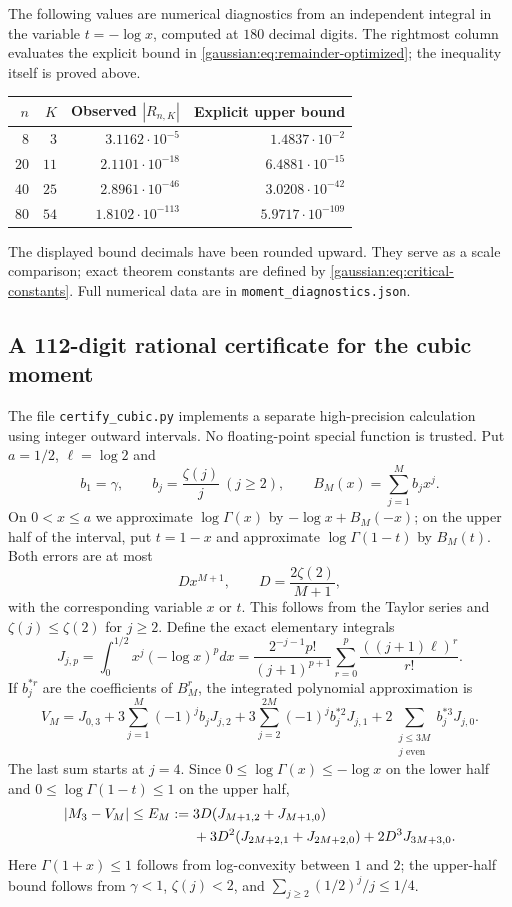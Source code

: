 The following values are numerical diagnostics from an independent integral
in the variable $t=-\log x$, computed at $180$ decimal digits.  The
rightmost column evaluates the explicit bound in
\eqref{gaussian:eq:remainder-optimized}; the inequality itself is proved above.
\begin{center}
\begin{tabular}{rrrr}
\hline
$n$ & $K$ & Observed $|R_{n,K}|$ & Explicit upper bound \\
\hline
$8$ & $3$ & $3.1162\cdot10^{-5}$ & $1.4837\cdot10^{-2}$ \\
$20$ & $11$ & $2.1101\cdot10^{-18}$ & $6.4881\cdot10^{-15}$ \\
$40$ & $25$ & $2.8961\cdot10^{-46}$ & $3.0208\cdot10^{-42}$ \\
$80$ & $54$ & $1.8102\cdot10^{-113}$ & $5.9717\cdot10^{-109}$ \\
\hline
\end{tabular}
\end{center}
The displayed bound decimals have been rounded upward.  They serve as a
scale comparison; exact theorem constants are defined by
\eqref{gaussian:eq:critical-constants}.  Full numerical data are in
\texttt{moment\_diagnostics.json}.

\subsection{A 112-digit rational certificate for the cubic moment}
The file \texttt{certify\_cubic.py} implements a separate high-precision
calculation using integer outward intervals.  No floating-point special
function is trusted.  Put $a=1/2$, $\ell=\log2$ and
\[
 b_1=\gamma,\qquad b_j=\frac{\zeta(j)}j\ (j\ge2),\qquad
 B_M(x)=\sum_{j=1}^{M}b_jx^j.
\]
On $0<x\le a$ we approximate
$\log\Gamma(x)$ by $-\log x+B_M(-x)$; on the upper half of the interval,
put $t=1-x$ and approximate $\log\Gamma(1-t)$ by $B_M(t)$.
Both errors are at most
\[
 D x^{M+1},\qquad D=\frac{2\zeta(2)}{M+1},
\]
with the corresponding variable $x$ or $t$.  This follows from the Taylor
series and $\zeta(j)\le\zeta(2)$ for $j\ge2$.
Define the exact elementary integrals
\[
 J_{j,p}=\int_0^{1/2}x^j(-\log x)^p dx
 =\frac{2^{-j-1}p!}{(j+1)^{p+1}}
 \sum_{r=0}^{p}\frac{((j+1)\ell)^r}{r!}.
\]
If $b^{*r}_j$ are the coefficients of $B_M^r$, the integrated polynomial
approximation is
\[
 V_M=J_{0,3}+3\sum_{j=1}^{M}(-1)^jb_jJ_{j,2}
 +3\sum_{j=2}^{2M}(-1)^jb^{*2}_jJ_{j,1}
 +2\sum_{\substack{j\le3M\\j\text{ even}}}b^{*3}_jJ_{j,0}.
\]
The last sum starts at $j=4$.  Since $0\le\log\Gamma(x)\le-\log x$
on the lower half and $0\le\log\Gamma(1-t)\le1$ on the upper half,
\begin{align}
 |M_3-V_M|\le E_M:={}&3D(J_{M+1,2}+J_{M+1,0})\notag\\
 &+3D^2(J_{2M+2,1}+J_{2M+2,0})+2D^3J_{3M+3,0}.
 \label{gaussian:eq:cubic-certified-error}
\end{align}
Here $\Gamma(1+x)\le1$ follows from log-convexity between $1$ and $2$;
the upper-half bound follows from $\gamma<1$, $\zeta(j)<2$, and
$\sum_{j\ge2}(1/2)^j/j\le1/4$.

